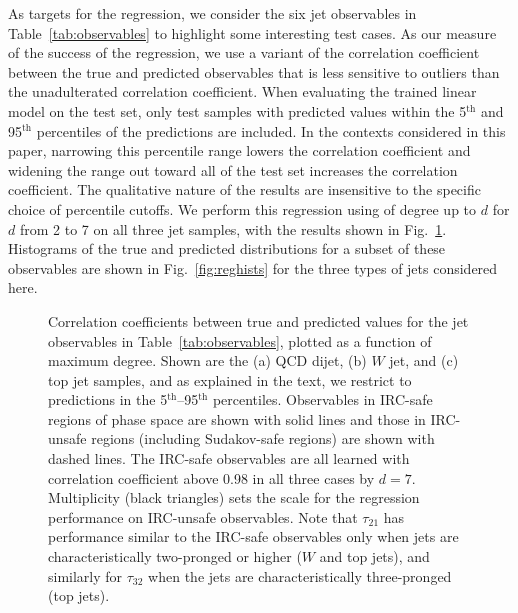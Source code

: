 \documentclass[letterpaper,11pt]{article}
\DeclareRobustCommand{\Tab}[1]{Table~\ref{#1}}
\DeclareRobustCommand{\Fig}[1]{Fig.~\ref{#1}}
\newcommand{\B}{\text{EFP}\xspace}
\newcommand{\Bs}{\text{EFPs}\xspace}
\begin{document}
As targets for the regression, we consider the six jet observables in \Tab{tab:observables} to highlight some interesting test cases. 
%
As our measure of the success of the regression, we use a variant of the correlation coefficient between the true and predicted observables that is less sensitive to outliers than the unadulterated correlation coefficient.
%
When evaluating the trained linear model on the test set, only test samples with predicted values within the 5$^\text{th}$ and 95$^\text{th}$ percentiles of the predictions are included.
%
In the contexts considered in this paper, narrowing this percentile range lowers the correlation coefficient and widening the range out toward all of the test set increases the correlation coefficient.
%
The qualitative nature of the results are insensitive to the specific choice of percentile cutoffs. 
%
We perform this regression using \Bs of degree up to $d$ for $d$ from 2 to 7 on all three jet samples, with the results shown in \Fig{fig:robustcorr}.
%
Histograms of the true and predicted distributions for a subset of these observables are shown in \Fig{fig:reghists} for the three types of jets considered here. 

\begin{figure}[t]
\centering
{}
\caption{Correlation coefficients between true and predicted values for the jet observables in \Tab{tab:observables}, plotted as a function of maximum \B degree. Shown are the (a) QCD dijet, (b) $W$ jet, and (c) top jet samples, and as explained in the text, we restrict to predictions in the 5$^\text{th}$--95$^\text{th}$ percentiles. Observables in IRC-safe regions of phase space are shown with solid lines and those in IRC-unsafe regions (including Sudakov-safe regions) are shown with dashed lines. The IRC-safe observables are all learned with correlation coefficient above 0.98 in all three cases by $d=7$. Multiplicity (black triangles) sets the scale for the regression performance on IRC-unsafe observables. Note that $\tau_{21}$ has performance similar to the IRC-safe observables only when jets are characteristically two-pronged or higher ($W$ and top jets), and similarly for $\tau_{32}$ when the jets are characteristically three-pronged (top jets).}
\label{fig:robustcorr}
\end{figure}
\end{document}
